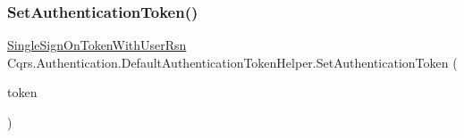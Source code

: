 \subsubsection{\texorpdfstring{Set\+Authentication\+Token()}{SetAuthenticationToken()}\hspace{0.1cm}{\footnotesize\ttfamily [3/3]}}
{\footnotesize\ttfamily \hyperlink{classCqrs_1_1Authentication_1_1SingleSignOnTokenWithUserRsn}{Single\+Sign\+On\+Token\+With\+User\+Rsn} Cqrs.\+Authentication.\+Default\+Authentication\+Token\+Helper.\+Set\+Authentication\+Token (\begin{DoxyParamCaption}\item[{\hyperlink{classCqrs_1_1Authentication_1_1SingleSignOnTokenWithUserRsn}{Single\+Sign\+On\+Token\+With\+User\+Rsn}}]{token }\end{DoxyParamCaption})}

